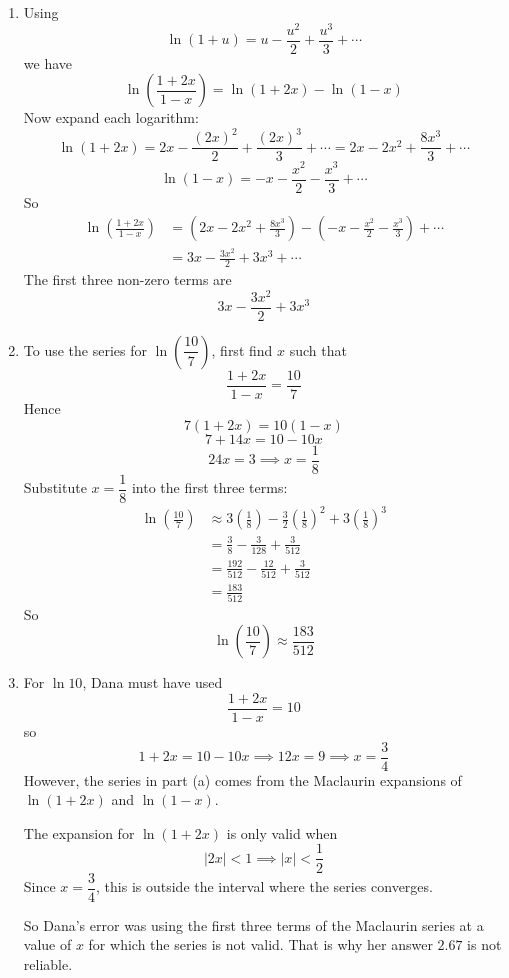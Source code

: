 \documentclass[leqno]{article}
\begin{document}
\begin{enumerate}[
  label=\textbf{\arabic*.},
  leftmargin=*,
  topsep=0pt,
  partopsep=0pt,
  parsep=0pt
]
\begin{tcolorbox}[colback=white, colframe=scarlet, title={\textbf{Solution}}, breakable, grow to left by=6mm, grow to right by=10mm]
\begin{enumerate}[label=\textbf{(\alph*)}]
  \item Using
  \[
  \ln(1+u)=u-\frac{u^2}{2}+\frac{u^3}{3}+\cdots
  \]
  we have
  \[
  \ln\left(\frac{1+2x}{1-x}\right)=\ln(1+2x)-\ln(1-x)
  \]
  Now expand each logarithm:
  \[
  \ln(1+2x)=2x-\frac{(2x)^2}{2}+\frac{(2x)^3}{3}+\cdots
  =2x-2x^2+\frac{8x^3}{3}+\cdots
  \]
  \[
  \ln(1-x)=-x-\frac{x^2}{2}-\frac{x^3}{3}+\cdots
  \]
  So
  \begin{align*}
  \ln\left(\frac{1+2x}{1-x}\right)
  &=\left(2x-2x^2+\frac{8x^3}{3}\right)-\left(-x-\frac{x^2}{2}-\frac{x^3}{3}\right)+\cdots \\
  &=3x-\frac{3x^2}{2}+3x^3+\cdots
  \end{align*}
  The first three non-zero terms are
  \[
  3x-\frac{3x^2}{2}+3x^3
  \]

  \item To use the series for \(\ln\left(\dfrac{10}{7}\right)\), first find \(x\) such that
  \[
  \frac{1+2x}{1-x}=\frac{10}{7}
  \]
  Hence
  \[
  7(1+2x)=10(1-x)
  \]
  \[
  7+14x=10-10x
  \]
  \[
  24x=3 \implies x=\frac18
  \]
  Substitute \(x=\dfrac18\) into the first three terms:
  \begin{align*}
  \ln\left(\frac{10}{7}\right)
  &\approx 3\left(\frac18\right)-\frac32\left(\frac18\right)^2+3\left(\frac18\right)^3 \\
  &=\frac38-\frac{3}{128}+\frac{3}{512} \\
  &=\frac{192}{512}-\frac{12}{512}+\frac{3}{512} \\
  &=\frac{183}{512}
  \end{align*}
  So
  \[
  \ln\left(\frac{10}{7}\right)\approx \frac{183}{512}
  \]

  \item For \(\ln 10\), Dana must have used
  \[
  \frac{1+2x}{1-x}=10
  \]
  so
  \[
  1+2x=10-10x \implies 12x=9 \implies x=\frac34
  \]
  However, the series in part (a) comes from the Maclaurin expansions of \(\ln(1+2x)\) and \(\ln(1-x)\).

  The expansion for \(\ln(1+2x)\) is only valid when
  \[
  |2x|<1 \implies |x|<\frac12
  \]
  Since \(x=\dfrac34\), this is outside the interval where the series converges.

  So Dana's error was using the first three terms of the Maclaurin series at a value of \(x\) for which the series is not valid. That is why her answer \(2.67\) is not reliable.
\end{enumerate}
\end{tcolorbox}



\end{enumerate}
\end{document}

